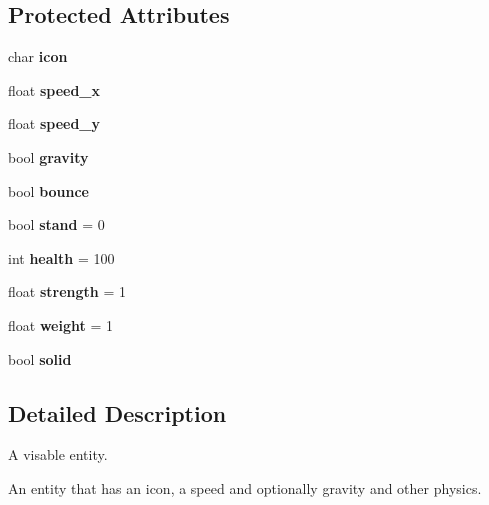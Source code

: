 \subsection*{Protected Attributes}
\begin{DoxyCompactItemize}
\item 
\mbox{\label{classentity_a276f34d880f0f31f9cd057e6568af672}} 
char {\bfseries icon}
\item 
\mbox{\label{classentity_ade26db2645e09e5cc93dea7688d158bb}} 
float {\bfseries speed\+\_\+x}
\item 
\mbox{\label{classentity_acfd9a2ea16306a4728fdc712b55732c0}} 
float {\bfseries speed\+\_\+y}
\item 
\mbox{\label{classentity_a66debba3d886c74a8f7b39a4f173d02e}} 
bool {\bfseries gravity}
\item 
\mbox{\label{classentity_aa2f2b1ebf9dccdf263ae7559b8ddf0bc}} 
bool {\bfseries bounce}
\item 
\mbox{\label{classentity_a1284d3366a58d5a6655bb7899e323533}} 
bool {\bfseries stand} = 0
\item 
\mbox{\label{classentity_a743f264f8bcb5ac53e4e28ab88ace871}} 
int {\bfseries health} = 100
\item 
\mbox{\label{classentity_a1aeb8437d4a5a56ef92dad3589ce0f88}} 
float {\bfseries strength} = 1
\item 
\mbox{\label{classentity_a7d0545e294792e49ad9e48f56f1863c2}} 
float {\bfseries weight} = 1
\item 
\mbox{\label{classentity_a0d9dca7195de473ad176923db9a7e073}} 
bool {\bfseries solid}
\end{DoxyCompactItemize}


\subsection{Detailed Description}
A visable entity. 

An entity that has an icon, a speed and optionally gravity and other physics. 

